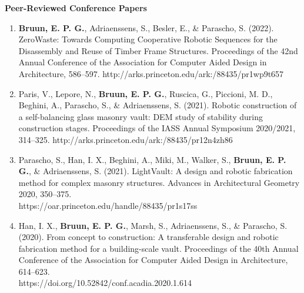     \vspace{0.5cm}
    \noindent\textbf{Peer-Reviewed Conference Papers}
    \begin{enumerate} [topsep=0pt]


        \item \textbf{Bruun, E. P. G.}, Adriaenssens, S., Besler, E., \& Parascho, S. (2022). ZeroWaste: Towards Computing Cooperative Robotic Sequences for the Disassembly and Reuse of Timber Frame Structures. Proceedings of the 42nd Annual Conference of the Association for Computer Aided Design in Architecture, 586–597. http://arks.princeton.edu/ark:/88435/pr1wp9t657
        \item Paris, V., Lepore, N., \textbf{Bruun, E. P. G.}, Ruscica, G., Piccioni, M. D., Beghini, A., Parascho, S., \& Adriaenssens, S. (2021). Robotic construction of a self-balancing glass masonry vault: DEM study of stability during construction stages. Proceedings of the IASS Annual Symposium 2020/2021, 314–325. http://arks.princeton.edu/ark:/88435/pr12n4zh86
        \item Parascho, S., Han, I. X., Beghini, A., Miki, M., Walker, S., \textbf{Bruun, E. P. G.}, \& Adriaenssens, S. (2021). LightVault: A design and robotic fabrication method for complex masonry structures. Advances in Architectural Geometry 2020, 350–375. \\ https://oar.princeton.edu/handle/88435/pr1s17ss
        \item Han, I. X., \textbf{Bruun, E. P. G.}, Marsh, S., Adriaenssens, S., \& Parascho, S. (2020). From concept to construction: A transferable design and robotic fabrication method for a building-scale vault. Proceedings of the 40th Annual Conference of the Association for Computer Aided Design in Architecture, 614–623. \\ https://doi.org/10.52842/conf.acadia.2020.1.614
    \end{enumerate}


\newpage
 

\begingroup
    \hypersetup{hidelinks} %
    
\endgroup
